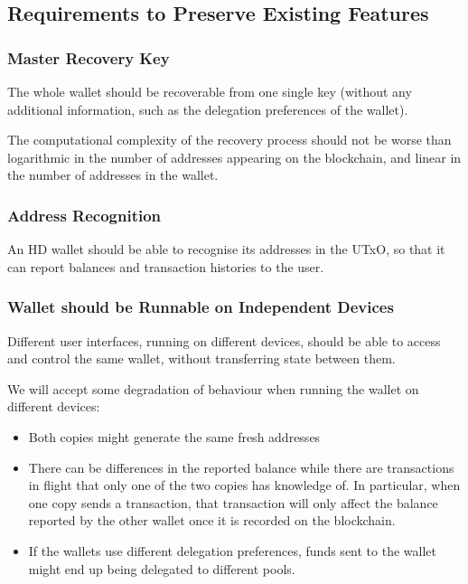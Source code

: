 \documentclass[11pt,a4paper,dvipsnames,twosided]{article}
\begin{document}
\subsection{Requirements to Preserve Existing Features}
\label{requirements-to-preserve-existing-features}

\subsubsection{Master Recovery Key}
\label{master-recovery-key}

The whole wallet should be recoverable from one single key (without any
additional information, such as the delegation preferences of the
wallet).

The computational complexity of the recovery process should not be worse
than logarithmic in the number of addresses appearing on the blockchain,
and linear in the number of addresses in the wallet.

\subsubsection{Address Recognition}
\label{address-recognition}

An HD wallet should be able to recognise its addresses in the UTxO, so
that it can report balances and transaction histories to the user.

\subsubsection{Wallet should be Runnable on Independent Devices}
\label{wallet-should-be-runnable-on-independent-devices}

Different user interfaces, running on different devices, should be able
to access and control the same wallet, without transferring state
between them.

We will accept some degradation of behaviour when running the wallet on
different devices:

\begin{itemize}
\item
  Both copies might generate the same fresh addresses
\item
  There can be differences in the reported balance while there are
  transactions in flight that only one of the two copies has knowledge
  of. In particular, when one copy sends a transaction, that transaction
  will only affect the balance reported by the other wallet once it is
  recorded on the blockchain.
\item
  If the wallets use different delegation preferences, funds sent to the
  wallet might end up being delegated to different pools.
\end{itemize}
\end{document}
